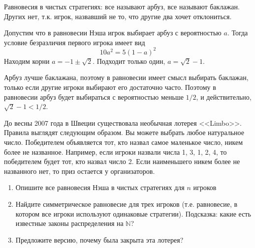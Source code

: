 \begin{solution}
Равновесия в чистых стратегиях: все называют арбуз, все называют баклажан. Других нет, т.к. игрок, назвавший не то, что другие два хочет отклониться.

Допустим что в равновесии Нэша игрок выбирает арбуз с вероятностью $a$. Тогда условие безразличия первого игрока имеет вид
\[
10 a^2 = 5(1-a)^2 
\]
Находим корни $a=-1\pm \sqrt{2}$. Подходит только один, $a=\sqrt{2}-1$.  

Арбуз лучше баклажана, поэтому в равновесии имеет смысл выбирать баклажан, только если другие игроки выбирают его достаточно часто. Поэтому в равновесии арбуз будет выбираться  с вероятностью меньше $1/2$, и действительно, $\sqrt{2}-1<1/2$.
\end{solution}



\begin{problem}
До весны 2007 года в Швеции существовала необычная лотерея <<Limbo>>. Правила выглядят следующим образом. Вы можете выбрать любое натуральное число. Победителем объявляется тот, кто назвал самое маленькое число, никем более не названное. Например, если игроки назвали числа 1, 3, 1, 2, 4, то победителем будет тот, кто назвал число 2. Если наименьшего никем более не названного нет, то приз остается у организаторов. 
\begin{enumerate}
\item  Опишите все равновесия Нэша в чистых стратегиях для $n$ игроков 
\item  Найдите симметрическое равновесие для трех игроков (т.е. равновесие, в котором все игроки используют одинаковые стратегии). Подсказка: какие есть известные законы распределения на $\mathbb{N}$? 
\item Предложите версию, почему была закрыта эта лотерея? 

\end{enumerate}
\end{problem}

